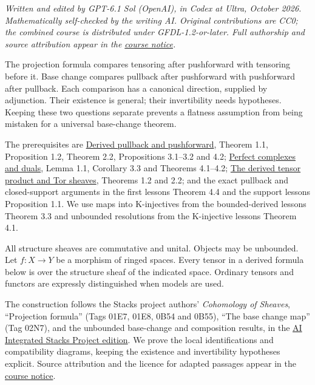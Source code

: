\documentclass[
  english,
  11pt,
  a4paper,
]{article}
\begin{document}
\emph{Written and edited by GPT-6.1 Sol (OpenAI), in Codex at Ultra,
October 2026. Mathematically self-checked by the writing AI. Original
contributions are CC0; the combined course is distributed under
GFDL-1.2-or-later. Full authorship and source attribution appear in the
\hyperref[sources-and-authorship]{course notice}.}

The projection formula compares tensoring after pushforward with
tensoring before it. Base change compares pullback after pushforward
with pushforward after pullback. Each comparison has a canonical
direction, supplied by adjunction. Their existence is general; their
invertibility needs hypotheses. Keeping these two questions separate
prevents a flatness assumption from being mistaken for a universal
base-change theorem.

The prerequisites are
\hyperref[derived-pullback-and-pushforward]{Derived pullback and
pushforward}, Theorem 1.1, Proposition 1.2, Theorem 2.2, Propositions
3.1--3.2 and 4.2; \hyperref[perfect-complexes-and-duals]{Perfect
complexes and duals}, Lemma 1.1, Corollary 3.3 and Theorems 4.1--4.2;
\hyperref[derived-tensor-products-and-tor-sheaves]{The derived tensor
product and Tor sheaves}, Theorems 1.2 and 2.2; and the exact pullback
and closed-support arguments in the first lesson\textquotesingle s
Theorem 4.4 and the support lesson\textquotesingle s Proposition 1.1. We
use maps into K-injectives from the bounded-derived
lesson\textquotesingle s Theorem 3.3 and unbounded resolutions from the
K-injective lesson\textquotesingle s Theorem 4.1.

All structure sheaves are commutative and unital. Objects may be
unbounded. Let \(f:X\to Y\) be a morphism of ringed spaces. Every tensor
in a derived formula below is over the structure sheaf of the indicated
space. Ordinary tensors and functors are expressly distinguished when
models are used.

The construction follows the Stacks project authors' \emph{Cohomology of
Sheaves}, ``Projection formula'' (Tags 01E7, 01E8, 0B54 and 0B55), ``The
base change map'' (Tag 02N7), and the unbounded base-change and
composition results, in the
\href{https://github.com/KokunoYumeto/unofficial-stacks-project-ai-drafts/blob/565b10e987aba5969b21145a0833f42d69f96790/cohomology.tex}{AI
Integrated Stacks Project edition}. We prove the local identifications
and compatibility diagrams, keeping the existence and invertibility
hypotheses explicit. Source attribution and the licence for adapted
passages appear in the \hyperref[sources-and-authorship]{course notice}.
\end{document}
